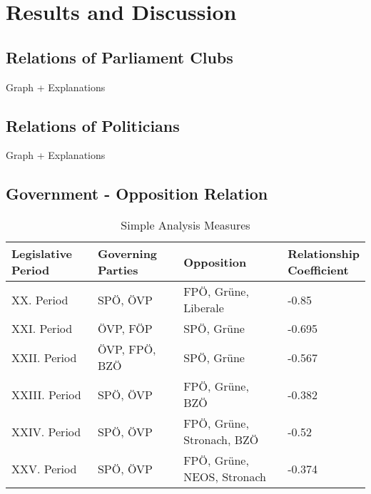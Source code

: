\chapter{Results and Discussion}
\label{chap:evaluation}

\section{Relations of Parliament Clubs}
\label{sec:relations_clubs}
Graph + Explanations

\section{Relations of Politicians}
Graph + Explanations

\section{Government - Opposition Relation}


\begin{table}[h]
\begin{tabular}{| l | l | p{4cm} | l |}
\hline
  Legislative Period & Governing Parties & Opposition & \linebreakcell{Relationship\\Coefficient}  \\
\hline
\hline
  XX. Period & SPÖ, ÖVP & FPÖ, Grüne, Liberale & -0.85 \\
\hline
  XXI. Period & ÖVP, FÖP & SPÖ, Grüne & -0.695 \\
\hline
  XXII. Period & ÖVP, FPÖ, BZÖ & SPÖ, Grüne & -0.567 \\
\hline
  XXIII. Period & SPÖ, ÖVP & FPÖ, Grüne, BZÖ & -0.382 \\
\hline
  XXIV. Period & SPÖ, ÖVP & FPÖ, Grüne, Stronach, BZÖ & -0.52 \\
\hline
  XXV. Period & SPÖ, ÖVP & FPÖ, Grüne, NEOS, Stronach & -0.374 \\
\hline

\end{tabular}

\caption{Simple Analysis Measures}
\label{table:simple_analysis}
\end{table}